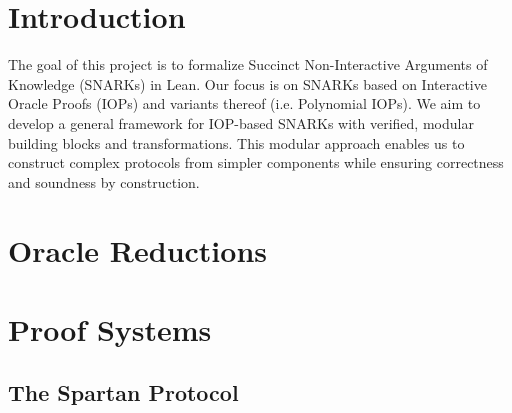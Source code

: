 %

\chapter{Introduction}

The goal of this project is to formalize Succinct Non-Interactive Arguments of Knowledge (SNARKs) in
Lean. Our focus is on SNARKs based on Interactive Oracle Proofs (IOPs) and variants thereof (i.e.
Polynomial IOPs). We aim to develop a general framework for IOP-based SNARKs with verified, modular
building blocks and transformations. This modular approach enables us to construct complex protocols
from simpler components while ensuring correctness and soundness by construction.

\chapter{Oracle Reductions}\label{chap:oracle_reductions}





\chapter{Proof Systems}\label{chap:proof_systems}









\section{The Spartan Protocol}

